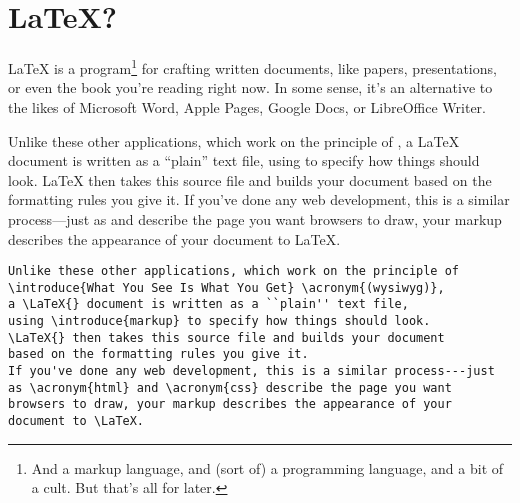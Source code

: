 \chapter{\texorpdfstring{\LaTeX}{LaTeX}?}

\LaTeX{} is a program\footnote{And a markup language,
and (sort of) a programming language, and a bit of a cult.
But that's all for later.}
for crafting written documents, like papers, presentations,
or even the book you're reading right now.
In some sense, it's an alternative to the likes of Microsoft Word,
Apple Pages, Google Docs, or LibreOffice Writer.

Unlike these other applications, which work on the principle of
 ,
a \LaTeX{} document is written as a ``plain'' text file,
using  to specify how things should look.
\LaTeX{} then takes this source file and builds your document
based on the formatting rules you give it.
If you've done any web development, this is a similar process---just
as  and  describe the page you want
browsers to draw, your markup describes the appearance of your
document to \LaTeX.

\begin{leftfigure}
\begin{lstlisting}
Unlike these other applications, which work on the principle of
\introduce{What You See Is What You Get} \acronym{(wysiwyg)},
a \LaTeX{} document is written as a ``plain'' text file,
using \introduce{markup} to specify how things should look.
\LaTeX{} then takes this source file and builds your document
based on the formatting rules you give it.
If you've done any web development, this is a similar process---just
as \acronym{html} and \acronym{css} describe the page you want
browsers to draw, your markup describes the appearance of your
document to \LaTeX.
\end{lstlisting}
\end{leftfigure}

